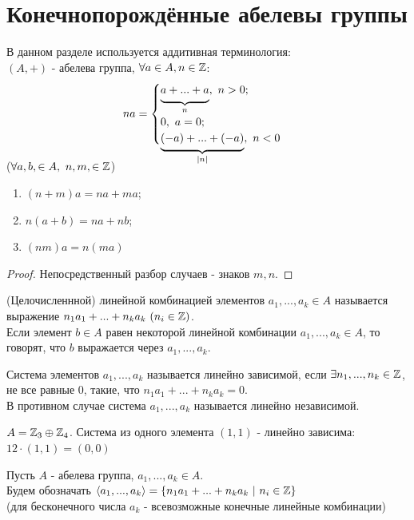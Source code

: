 \section{Конечнопорождённые абелевы группы}
\begin{remark}
    В данном разделе используется аддитивная терминология: \\
    $(A, +)$ - абелева группа, $\forall a \in A, n \in \mathbb{Z}$:
    \[na = \begin{cases}
        \undermat{n}{a + ... + a}, \ n > 0;\\
        \\
        0, \ a = 0;\\
        \undermat{|n|}{(-a) + ... + (-a)}, \ n < 0
    \end{cases}\] 
\end{remark}
\begin{properties} ($\forall a, b, \in A, \ n, m, \in \mathbb{Z}$)
    \begin{enumerate}
        \item $(n+m)a = na + ma$;
        \item $n(a+b) = na + nb$;
        \item $(nm)a = n(ma)$
    \end{enumerate}
\end{properties}
\begin{proof}
    Непосредственный разбор случаев - знаков $m, n$.
\end{proof}
\begin{definition}
    (Целочисленнной) линейной комбинацией элементов $a_1,...,a_k \in A$ называется выражение $n_1a_1 + ... + n_ka_k \ (n_i \in \Z)$.\\
    Если элемент $b \in A$ равен некоторой линейной комбинации $a_1,...,a_k \in A$, то говорят, что $b$ выражается через $a_1,...,a_k$.
\end{definition}
\begin{definition}
    Система элементов $a_1,...,a_k$ называется линейно зависимой, если $\exists n_1,...,n_k \in \mathbb{Z}$, не все равные 0, такие, что $n_1a_1 + ... + n_ka_k = 0$.\\
    В противном случае система $a_1,...,a_k$ называется линейно независимой.
\end{definition}
\begin{example}
    $A = \mathbb{Z}_3 \oplus \mathbb{Z}_4$. Система из одного элемента $(1, 1)$ - линейно зависима: $12 \cdot (1, 1) = (0, 0)$
\end{example}
\begin{definition}
    Пусть $A$ - абелева группа, $a_1,...,a_k \in A$. \\
    Будем обозначать $\langle a_1,...,a_k \rangle = \{n_1a_1 + ... + n_ka_k \ | \ n_i \in \mathbb{Z}\}$\\
    (для бесконечного числа $a_k$ - всевозможные конечные линейные комбинации)
\end{definition}
